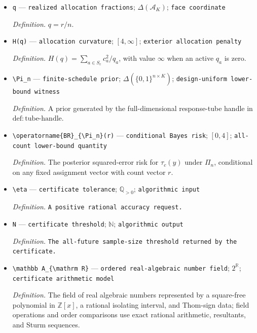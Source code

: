 \documentclass{article}
\begin{document}
\begin{itemize}
  \item \texttt{q} --- \texttt{realized allocation fractions}; \(\Delta(\mathcal A_K)\); \texttt{face coordinate}
  \par\smallskip\noindent\emph{Definition.} \(q=r/n\).
  \item \texttt{H(q)} --- \texttt{allocation curvature}; \([4,\infty]\); \texttt{exterior allocation penalty}
  \par\smallskip\noindent\emph{Definition.} \(H(q)=\sum_{a\in S_c}c_a^2/q_a\), with value \(\infty\) when an active \(q_a\) is zero.
  \item \texttt{\textbackslash{}\allowbreak{}Pi\_\allowbreak{}n} --- \texttt{finite-\allowbreak{}schedule prior}; \(\Delta(\{0,1\}^{n\times K})\); \texttt{design-\allowbreak{}uniform lower-\allowbreak{}bound witness}
  \par\smallskip\noindent\emph{Definition.} A prior generated by the full-dimensional response-tube handle in \(\mathrm{def:tube\text{-}handle}\).
  \item \texttt{\textbackslash{}\allowbreak{}operatorname\{BR\}\allowbreak{}\_\allowbreak{}\{\textbackslash{}\allowbreak{}Pi\_\allowbreak{}n\}\allowbreak{}(r)} --- \texttt{conditional Bayes risk}; \([0,4]\); \texttt{all-\allowbreak{}count lower-\allowbreak{}bound quantity}
  \par\smallskip\noindent\emph{Definition.} The posterior squared-error risk for \(\tau_c(y)\) under \(\Pi_n\), conditional on any fixed assignment vector with count vector \(r\).
  \item \texttt{\textbackslash{}\allowbreak{}eta} --- \texttt{certificate tolerance}; \(\mathbb Q_{>0}\); \texttt{algorithmic input}
  \par\smallskip\noindent\emph{Definition.} \texttt{A positive rational accuracy request.}
  \item \texttt{N} --- \texttt{certificate threshold}; \(\mathbb N\); \texttt{algorithmic output}
  \par\smallskip\noindent\emph{Definition.} \texttt{The all-\allowbreak{}future sample-\allowbreak{}size threshold returned by the certificate.}
  \item \texttt{\textbackslash{}\allowbreak{}mathbb A\_\allowbreak{}\{\textbackslash{}\allowbreak{}mathrm R\}\allowbreak{}} --- \texttt{ordered real-\allowbreak{}algebraic number field}; \(2^{\mathbb R}\); \texttt{certificate arithmetic model}
  \par\smallskip\noindent\emph{Definition.} The field of real algebraic numbers represented by a square-free polynomial in \(\mathbb Z[x]\), a rational isolating interval, and Thom-sign data; field operations and order comparisons use exact rational arithmetic, resultants, and Sturm sequences.

\end{itemize}
\end{document}
